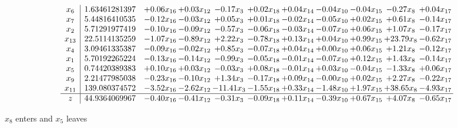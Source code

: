 \documentclass[9pt]{article}
\begin{document}
 \[\begin{array}{c| c c@{\hskip 2pt} c@{\hskip 2pt} c@{\hskip 2pt} c@{\hskip 2pt} c@{\hskip 2pt} c@{\hskip 2pt} c@{\hskip 2pt} c@{\hskip 2pt} c@{\hskip 2pt} }
 x_{6}   &  1.63461281397 & +  0.06 x_{16} & +  0.03 x_{12} & -0.17 x_{3} & +  0.02 x_{18} & +  0.04 x_{14} & -0.04 x_{10} & -0.04 x_{15} & -0.27 x_{8} & +  0.04 x_{17}\\
 x_{7}   &  5.44816410535 & -0.12 x_{16} & -0.03 x_{12} & +  0.05 x_{3} & +  0.01 x_{18} & -0.02 x_{14} & -0.05 x_{10} & +  0.02 x_{15} & +  0.61 x_{8} & -0.14 x_{17}\\
 x_{2}   &  5.71291977419 & -0.10 x_{16} & -0.09 x_{12} & -0.57 x_{3} & -0.06 x_{18} & -0.03 x_{14} & -0.07 x_{10} & +  0.06 x_{15} & +  1.07 x_{8} & -0.17 x_{17}\\
 x_{13}   &  22.5114135259 & -1.07 x_{16} & -0.89 x_{12} & +  2.22 x_{3} & -0.78 x_{18} & +  0.13 x_{14} & +  0.04 x_{10} & +  0.99 x_{15} & + 23.79 x_{8} & -0.62 x_{17}\\
 x_{4}   &  3.09461335387 & -0.09 x_{16} & -0.02 x_{12} & +  0.85 x_{3} & -0.07 x_{18} & +  0.04 x_{14} & +  0.00 x_{10} & +  0.06 x_{15} & +  1.21 x_{8} & -0.12 x_{17}\\
 x_{1}   &  5.70192265224 & -0.13 x_{16} & -0.14 x_{12} & -0.99 x_{3} & -0.05 x_{18} & -0.01 x_{14} & -0.07 x_{10} & +  0.12 x_{15} & +  1.43 x_{8} & -0.14 x_{17}\\
 x_{5}   &  0.74420389383 & +  0.10 x_{16} & +  0.03 x_{12} & -0.03 x_{3} & +  0.08 x_{18} & -0.01 x_{14} & +  0.03 x_{10} & -0.04 x_{15} & -1.33 x_{8} & +  0.06 x_{17}\\
 x_{9}   &  2.21477985038 & -0.23 x_{16} & -0.10 x_{12} & +  1.34 x_{3} & -0.17 x_{18} & +  0.09 x_{14} & -0.00 x_{10} & +  0.02 x_{15} & +  2.27 x_{8} & -0.22 x_{17}\\
 x_{11}   &  139.080374572 & -3.52 x_{16} & -2.62 x_{12} & -11.41 x_{3} & -1.55 x_{18} & +  0.33 x_{14} & -1.48 x_{10} & +  1.97 x_{15} & + 38.65 x_{8} & -4.93 x_{17}\\
\hline
z    &  44.9364069967 & -0.40 x_{16} & -0.41 x_{12} & -0.31 x_{3} & -0.09 x_{18} & +  0.11 x_{14} & -0.39 x_{10} & +  0.67 x_{15} & +  4.07 x_{8} & -0.65 x_{17}\\
\end{array}\]


 $ x_{8} $ enters and $ x_{5} $ leaves 
\end{document}
